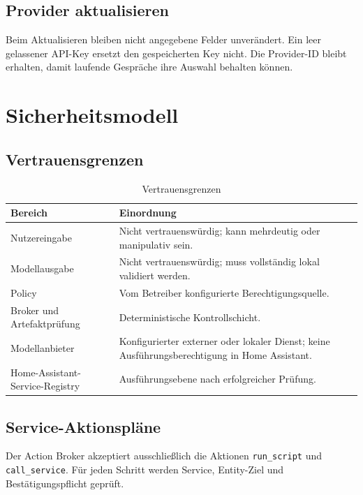 \documentclass[
  11pt,
  a4paper,
  oneside,
  parskip=half
]{scrreprt}
\newcommand{\code}[1]{\texttt{#1}}
\begin{document}
\section{Provider aktualisieren}

Beim Aktualisieren bleiben nicht angegebene Felder unverändert. Ein leer gelassener
API-Key ersetzt den gespeicherten Key nicht. Die Provider-ID bleibt erhalten, damit
laufende Gespräche ihre Auswahl behalten können.

\chapter{Sicherheitsmodell}

\section{Vertrauensgrenzen}

\begin{table}[htbp]
  \centering
  \begin{tabularx}{\textwidth}{@{}L{45mm}Y@{}}
    \toprule
    \textbf{Bereich} & \textbf{Einordnung} \\
    \midrule
    Nutzereingabe & Nicht vertrauenswürdig; kann mehrdeutig oder manipulativ sein. \\
    Modellausgabe & Nicht vertrauenswürdig; muss vollständig lokal validiert werden. \\
    Policy & Vom Betreiber konfigurierte Berechtigungsquelle. \\
    Broker und Artefaktprüfung & Deterministische Kontrollschicht. \\
    Modellanbieter & Konfigurierter externer oder lokaler Dienst; keine
    Ausführungsberechtigung in Home Assistant. \\
    Home-Assistant-Service-Registry & Ausführungsebene nach erfolgreicher Prüfung. \\
    \bottomrule
  \end{tabularx}
  \caption{Vertrauensgrenzen}
\end{table}

\section{Service-Aktionspläne}

Der Action Broker akzeptiert ausschließlich die Aktionen \code{run\_script} und
\code{call\_service}. Für jeden Schritt werden Service, Entity-Ziel und
Bestätigungspflicht geprüft.
\end{document}
